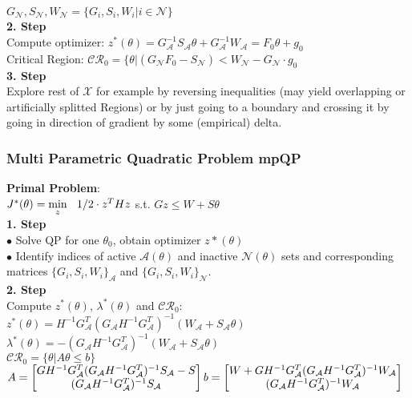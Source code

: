 \documentclass[10pt,parskip]{scrartcl}
\begin{document}
\begin{multicols*}{3}
$G_{\mathcal{N}}, S_{\mathcal{N}}, W_{\mathcal{N}}=\{G_i, S_i, W_i | i \in {\mathcal{N}} \}$\\
\textbf{2. Step}\\
Compute optimizer: $z^*(\theta) = G_{\mathcal{A}}^{-1} S_{\mathcal{A}} \theta + G_{\mathcal{A}}^{-1} W_{\mathcal{A}} = F_0 \theta + g_0$\\
Critical Region: $\mathcal{CR}_0 = \{\theta | (G_{\mathcal{N}} F_0 - S_{\mathcal{N}}) < W_{\mathcal{N}} - G_{\mathcal{N}} \cdot g_0$\\
\textbf{3. Step}\\
Explore rest of ${\mathcal{X}}$ for example by reversing inequalities (may yield overlapping or artificially splitted Regions) or by just going to a boundary and crossing it by going in direction of gradient by some (empirical) delta.


\subsubsection{Multi Parametric Quadratic Problem mpQP}
\textbf{Primal Problem}:\\
$J^*(\theta) = \min\limits_{z} \hspace{0.25cm} 1/2 \cdot z^T H z$ \hspace{1cm} s.t. $Gz \leq W+S \theta$\\
\textbf{1. Step}\\
$\bullet$ Solve QP for one $\theta_0$, obtain optimizer $z*(\theta)$\\
$\bullet$ Identify indices of active $\mathcal{A}(\theta)$ and inactive $\mathcal{N}(\theta)$ sets and corresponding matrices $\{G_i, S_i, W_i\}_\mathcal{A}$ and $\{G_i, S_i, W_i\}_\mathcal{N}$.\\
\textbf{2. Step}\\
Compute $z^*(\theta)$, $\lambda^*(\theta)$ and $\mathcal{CR}_0$:\\
$z^*(\theta) = H^{-1} G_{\mathcal{A}}^T (G_{\mathcal{A}} H ^{-1} G_{\mathcal{A}}^T)^{-1}(W_{\mathcal{A}} + S_{\mathcal{A}} \theta) $\\
$\lambda^*(\theta) = -(G_{\mathcal{A}} H^{-1} G_{\mathcal{A}}^T)^{-1}(W_{\mathcal{A}} + S_{\mathcal{A}} \theta) $\\
$\mathcal{CR}_0 = \{\theta | A \theta \leq b\}$\\
$A = \begin{bmatrix} 
G H^{-1} G_{\mathcal{A}}^T (G_{\mathcal{A}} H ^{-1} G_{\mathcal{A}}^T)^{-1} S_{\mathcal{A}} - S\\ 
(G_{\mathcal{A}} H^{-1} G_{\mathcal{A}}^T)^{-1} S_{\mathcal{A}}
\end{bmatrix}\\
b = 
\begin{bmatrix}
W + G H^{-1} G_{\mathcal{A}}^T (G_{\mathcal{A}} H ^{-1} G_{\mathcal{A}}^T)^{-1} W_{\mathcal{A}}\\
(G_{\mathcal{A}} H^{-1} G_{\mathcal{A}}^T)^{-1} W_{\mathcal{A}}
\end{bmatrix}
$


\end{multicols*}
\end{document}
